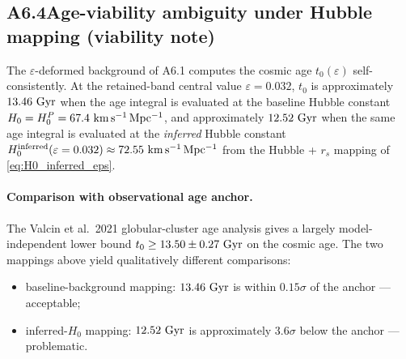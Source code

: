\subsection*{A6.4\quad Age-viability ambiguity under Hubble mapping
(viability note)}

The $\varepsilon$-deformed background of A6.1 computes the cosmic
age $t_0(\varepsilon)$ self-consistently. At the retained-band
central value $\varepsilon = 0.032$, $t_0$ is approximately
$13.46~{\rm Gyr}$ when the age integral is evaluated at the
baseline Hubble constant $H_0 = H_0^P = 67.4~{\rm km\,s^{-1}\,Mpc^{-1}}$,
and approximately $12.52~{\rm Gyr}$ when the same age integral is
evaluated at the \emph{inferred} Hubble constant
$H_0^{\rm inferred}(\varepsilon = 0.032) \approx 72.55~{\rm km\,s^{-1}\,Mpc^{-1}}$
from the Hubble + $r_s$ mapping of \eqref{eq:H0_inferred_eps}.

\paragraph{Comparison with observational age anchor.}
The Valcin et al.\ 2021 globular-cluster age analysis
\cite{Valcin2021} gives a largely model-independent lower bound
$t_0 \geq 13.50 \pm 0.27~{\rm Gyr}$ on the cosmic age. The two
mappings above yield qualitatively different comparisons:
\begin{itemize}
\item baseline-background mapping: $13.46~{\rm Gyr}$ is
   within $0.15\sigma$ of the anchor --- acceptable;
\item inferred-$H_0$ mapping: $12.52~{\rm Gyr}$ is
   approximately $3.6\sigma$ below the anchor --- problematic.
\end{itemize}
